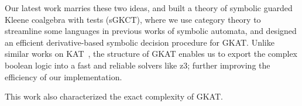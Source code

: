 \documentclass[11pt,a4paper,sans]{moderncv} %
\begin{document}
Our latest work marries these two ideas, and built a theory of symbolic guarded Kleene coalgebra with tests (sGKCT), where we use category theory to streamline some languages in previous works of symbolic automata, and designed an efficient derivative-based symbolic decision procedure for GKAT. 
Unlike similar works on KAT~\cite{pous_SymbolicAlgorithmsLanguage_2015}, the structure of GKAT enables us to export the complex boolean logic into a fast and reliable solvers like z3; further improving the efficiency of our implementation.

This work also characterized the exact complexity of GKAT.






\printbibliography %
\end{document}

